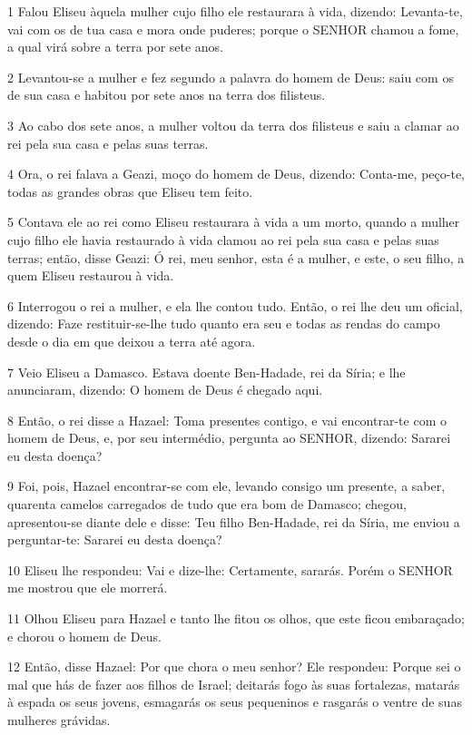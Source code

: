 \par 1 Falou Eliseu àquela mulher cujo filho ele restaurara à vida, dizendo: Levanta-te, vai com os de tua casa e mora onde puderes; porque o SENHOR chamou a fome, a qual virá sobre a terra por sete anos.
\par 2 Levantou-se a mulher e fez segundo a palavra do homem de Deus: saiu com os de sua casa e habitou por sete anos na terra dos filisteus.
\par 3 Ao cabo dos sete anos, a mulher voltou da terra dos filisteus e saiu a clamar ao rei pela sua casa e pelas suas terras.
\par 4 Ora, o rei falava a Geazi, moço do homem de Deus, dizendo: Conta-me, peço-te, todas as grandes obras que Eliseu tem feito.
\par 5 Contava ele ao rei como Eliseu restaurara à vida a um morto, quando a mulher cujo filho ele havia restaurado à vida clamou ao rei pela sua casa e pelas suas terras; então, disse Geazi: Ó rei, meu senhor, esta é a mulher, e este, o seu filho, a quem Eliseu restaurou à vida.
\par 6 Interrogou o rei a mulher, e ela lhe contou tudo. Então, o rei lhe deu um oficial, dizendo: Faze restituir-se-lhe tudo quanto era seu e todas as rendas do campo desde o dia em que deixou a terra até agora.
\par 7 Veio Eliseu a Damasco. Estava doente Ben-Hadade, rei da Síria; e lhe anunciaram, dizendo: O homem de Deus é chegado aqui.
\par 8 Então, o rei disse a Hazael: Toma presentes contigo, e vai encontrar-te com o homem de Deus, e, por seu intermédio, pergunta ao SENHOR, dizendo: Sararei eu desta doença?
\par 9 Foi, pois, Hazael encontrar-se com ele, levando consigo um presente, a saber, quarenta camelos carregados de tudo que era bom de Damasco; chegou, apresentou-se diante dele e disse: Teu filho Ben-Hadade, rei da Síria, me enviou a perguntar-te: Sararei eu desta doença?
\par 10 Eliseu lhe respondeu: Vai e dize-lhe: Certamente, sararás. Porém o SENHOR me mostrou que ele morrerá.
\par 11 Olhou Eliseu para Hazael e tanto lhe fitou os olhos, que este ficou embaraçado; e chorou o homem de Deus.
\par 12 Então, disse Hazael: Por que chora o meu senhor? Ele respondeu: Porque sei o mal que hás de fazer aos filhos de Israel; deitarás fogo às suas fortalezas, matarás à espada os seus jovens, esmagarás os seus pequeninos e rasgarás o ventre de suas mulheres grávidas.
